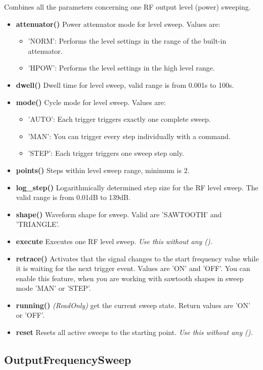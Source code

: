 \documentclass[11pt]{article} %
\begin{document}
Combines all the parameters concerning one RF output level (power) sweeping.
\begin{itemize}
\item {\bf attenuator()} Power attenuator mode for level sweep. Values are:
	\begin{itemize}[]
	\item 'NORM': Performs the level settings in the range of the built-in attenuator.
	\item 'HPOW': Performs the level settings in the high level range.
	\end{itemize}
\item {\bf dwell()} Dwell time for level sweep, valid range is from 0.001s to 100s.
\item {\bf mode()} Cycle mode for level sweep. Values are:
	\begin{itemize}[]
	\item 'AUTO': Each trigger triggers exactly one complete sweep.
	\item 'MAN':  You can trigger every step individually with a command.
	\item 'STEP': Each trigger triggers one sweep step only.
	\end{itemize}
\item {\bf points()} Steps within level sweep range, minimum is 2.
\item {\bf log\_step()} Logarithmically determined step size for the RF level sweep. The valid range is from 0.01dB to 139dB.
\item {\bf shape()} Waveform shape for sweep. Valid are 'SAWTOOTH' and 'TRIANGLE'.
\item {\bf execute} Executes one RF level sweep. {\it Use this without any ().}
\item {\bf retrace()} Activates that the signal changes to the start frequency value while it is waiting for the
next trigger event.  Values are 'ON' and 'OFF'. You can enable this feature, when you are working with sawtooth shapes in sweep mode 'MAN' or 'STEP'.
\item {\bf running()} {\it (ReadOnly)} get the current sweep state. Return values are 'ON' or 'OFF'.
\item {\bf reset} Resets all active sweeps to the starting point. {\it Use this without any ().}
\end{itemize}


\subsection{OutputFrequencySweep}
\end{document}
